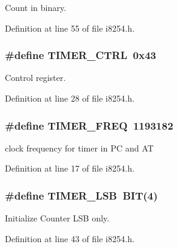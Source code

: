 Count in binary. 



Definition at line 55 of file i8254.\+h.

\hypertarget{group__i8254_ga282832448fb0281ef53d243c1cd48491}{}
\subsubsection[{T\+I\+M\+E\+R\+\_\+\+C\+T\+R\+L}]{\setlength{\rightskip}{0pt plus 5cm}\#define T\+I\+M\+E\+R\+\_\+\+C\+T\+R\+L~0x43}\label{group__i8254_ga282832448fb0281ef53d243c1cd48491}


Control register. 



Definition at line 28 of file i8254.\+h.

\hypertarget{group__i8254_gacf926951944b6cf370b7229ebd50dd8b}{}
\subsubsection[{T\+I\+M\+E\+R\+\_\+\+F\+R\+E\+Q}]{\setlength{\rightskip}{0pt plus 5cm}\#define T\+I\+M\+E\+R\+\_\+\+F\+R\+E\+Q~1193182}\label{group__i8254_gacf926951944b6cf370b7229ebd50dd8b}


clock frequency for timer in P\+C and A\+T 



Definition at line 17 of file i8254.\+h.

\hypertarget{group__i8254_gac18cb814ebd0d67235392c330e0e3504}{}
\subsubsection[{T\+I\+M\+E\+R\+\_\+\+L\+S\+B}]{\setlength{\rightskip}{0pt plus 5cm}\#define T\+I\+M\+E\+R\+\_\+\+L\+S\+B~{\bf B\+I\+T}(4)}\label{group__i8254_gac18cb814ebd0d67235392c330e0e3504}


Initialize Counter L\+S\+B only. 



Definition at line 43 of file i8254.\+h.


